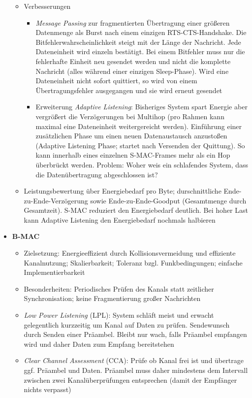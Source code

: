 \begin{itemize}
\begin{itemize}
		\item Verbesserungen
		\begin{itemize}
			\item \textit{Message Passing} zur fragmentierten Übertragung einer größeren Datenmenge als Burst nach einem einzigen RTS-CTS-Handshake. Die Bitfehlerwahrscheinlichkeit steigt mit der Länge der Nachricht. Jede Dateneinheit wird einzeln bestätigt. Bei einem Bitfehler muss nur die fehlerhafte Einheit neu gesendet werden und nicht die komplette Nachricht (alles während einer einzigen Sleep-Phase). Wird eine Dateneinheit nicht sofort quittiert, so wird von einem Übertragungsfehler ausgegangen und sie wird erneut gesendet
			\item Erweiterung \textit{Adaptive Listening}: Bisheriges System spart Energie aber vergrößert die Verzögerungen bei Multihop (pro Rahmen kann maximal eine Dateneinheit weitergereicht werden). Einführung einer zusätzlichen Phase um einen neuen Datenaustausch anzustoßen (Adaptive Listening Phase; startet nach Versenden der Quittung). So kann innerhalb eines einzelnen S-MAC-Frames mehr als ein Hop überbrückt werden. Problem: Woher weis ein schlafendes System, dass die Datenübertragung abgeschlossen ist?
		\end{itemize}
		\item Leistungsbewertung über Energiebedarf pro Byte; durschnittliche Ende-zu-Ende-Verzögerung sowie Ende-zu-Ende-Goodput (Gesamtmenge durch Gesamtzeit). S-MAC reduziert den Energiebedarf deutlich. Bei hoher Last kann Adaptive Listening den Energiebedarf nochmals halbieren
	\end{itemize}
	\item \textbf{B-MAC}
	\begin{itemize}
		\item Zielsetzung: Energieeffizient durch Kollisionsvermeidung und effiziente Kanalnutzung; Skalierbarkeit; Toleranz bzgl. Funkbedingungen; einfache Implementierbarkeit
		\item Besonderheiten: Periodisches Prüfen des Kanals statt zeitlicher Synchronisation; keine Fragmentierung großer Nachrichten
		\item \textit{Low Power Listening} (LPL): System schläft meist und erwacht gelegentlich kurzzeitig um Kanal auf Daten zu prüfen. Sendewunsch durch Senden einer Präambel. Bleibt nur wach, falls Präambel empfangen wird und daher Daten zum Empfang bereitstehen
		\item \textit{Clear Channel Assessment} (CCA): Prüfe ob Kanal frei ist und übertrage ggf. Präambel und Daten. Präambel muss daher mindestens dem Intervall zwischen zwei Kanalüberprüfungen entsprechen (damit der Empfänger nichts verpasst)

\end{itemize}
\end{itemize}
